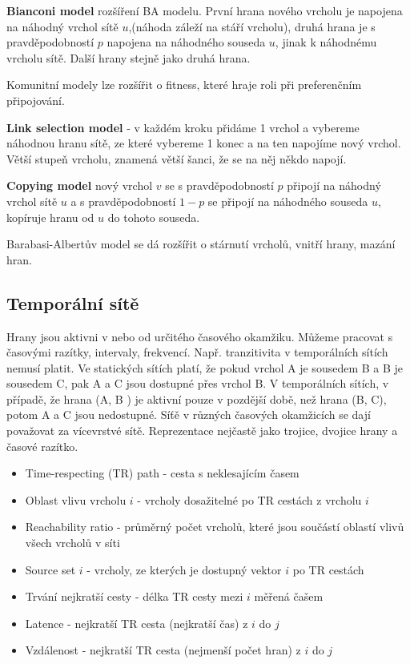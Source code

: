 \documentclass[a4paper,12pt]{article}
\begin{document}
\textbf{Bianconi model} rozšíření BA modelu. První hrana nového vrcholu je napojena na náhodný vrchol sítě $u$,(náhoda záleží na stáří vrcholu), druhá hrana
je s pravděpodobností $p$ napojena na náhodného souseda $u$, jinak k náhodnému vrcholu sítě. Další hrany stejně jako druhá hrana.

Komunitní modely lze rozšířit o fitness, které hraje roli při preferenčním připojování.

\textbf{Link selection model} - v každém kroku přidáme 1 vrchol a vybereme náhodnou hranu sítě, ze které vybereme 1 konec a na ten napojíme nový vrchol.
Větší stupeň vrcholu, znamená větší šanci, že se na něj někdo napojí.

\textbf{Copying model} nový vrchol $v$ se s pravděpodobností $p$ připojí na náhodný vrchol sítě $u$ a s pravděpodobností $1-p$ se připojí na náhodného souseda $u$,
kopíruje hranu od $u$ do tohoto souseda.

Barabasi-Albertův model se dá rozšířit o stárnutí vrcholů, vnitří hrany, mazání hran.

\subsection{Temporální sítě}
Hrany jsou aktivni v nebo od určitého časového okamžiku. Můžeme pracovat s časovými razítky, intervaly, frekvencí.
Např. tranzitivita v temporálních sítích nemusí platit. Ve statických sítích platí, že pokud vrchol A je sousedem B a B je sousedem C, pak A a C jsou 
dostupné přes vrchol B. V temporálních sítích, v případě, že hrana (A, B ) je aktivní pouze v pozdější době, než hrana (B, C), potom A a C jsou
nedostupné. Síťě v různých časových okamžicích se dají považovat za vícevrstvé sítě. Reprezentace nejčastě jako trojice, dvojice hrany a časové razítko.

\begin{itemize}
    \item Time-respecting (TR) path - cesta s neklesajícím časem
    \item Oblast vlivu vrcholu $i$ - vrcholy dosažitelné po TR cestách z vrcholu $i$
    \item Reachability ratio -  průměrný počet vrcholů, které jsou součástí oblastí vlivů všech vrcholů v síti
    \item Source set $i$ - vrcholy, ze kterých je dostupný vektor $i$ po TR cestách
    \item Trvání nejkratší cesty - délka TR cesty mezi $i$ měřená čašem
    \item Latence - nejkratší TR cesta (nejkratší čas) z $i$ do $j$
    \item Vzdálenost - nejkratší TR cesta (nejmenší počet hran) z $i$ do $j$
\end{itemize}
\end{document}
